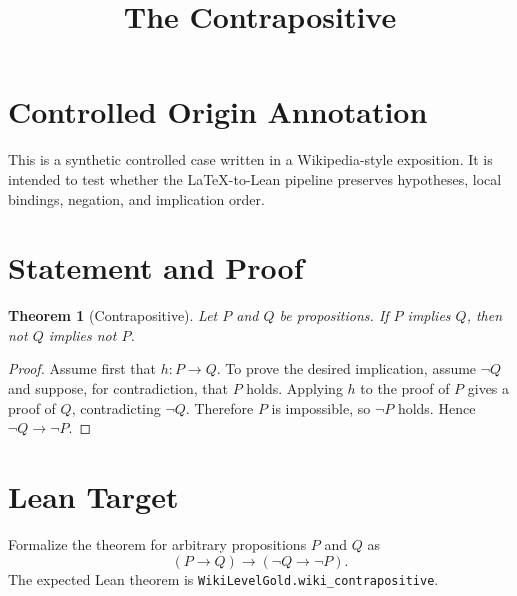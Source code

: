 \documentclass[11pt]{article}
\title{The Contrapositive}
\author{}
\date{}
\newtheorem{theorem}{Theorem}
\begin{document}
\maketitle

\section*{Controlled Origin Annotation}
This is a synthetic controlled case written in a Wikipedia-style exposition.
It is intended to test whether the LaTeX-to-Lean pipeline preserves hypotheses,
local bindings, negation, and implication order.

\section*{Statement and Proof}

\begin{theorem}[Contrapositive]
Let $P$ and $Q$ be propositions. If $P$ implies $Q$, then not $Q$ implies
not $P$.
\end{theorem}

\begin{proof}
Assume first that $h : P \to Q$. To prove the desired implication, assume
$\neg Q$ and suppose, for contradiction, that $P$ holds. Applying $h$ to the
proof of $P$ gives a proof of $Q$, contradicting $\neg Q$. Therefore $P$ is
impossible, so $\neg P$ holds. Hence $\neg Q \to \neg P$.
\end{proof}

\section*{Lean Target}
Formalize the theorem for arbitrary propositions $P$ and $Q$ as
\[
  (P \to Q) \to (\neg Q \to \neg P).
\]
The expected Lean theorem is \texttt{WikiLevelGold.wiki\_contrapositive}.
\end{document}
